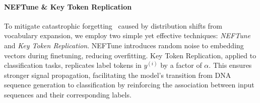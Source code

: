 \paragraph{NEFTune \& Key Token Replication}  
To mitigate catastrophic forgetting~\cite{zheng2024towards} caused by distribution shifts from vocabulary expansion, we employ two simple yet effective techniques: \textit{NEFTune}~\citep{press2021train} and \textit{Key Token Replication}. NEFTune introduces random noise to embedding vectors during finetuning, reducing overfitting. Key Token Replication, applied to classification tasks, replicates label tokens in \( y^{(i)} \) by a factor of \( \alpha \). This ensures stronger signal propagation, facilitating the model’s transition from DNA sequence generation to classification by reinforcing the association between input sequences and their corresponding labels.



